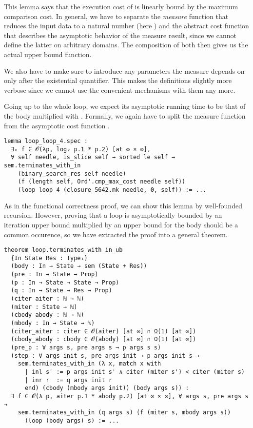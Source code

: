 This lemma says that the execution cost of  is linearly bound by
the maximum comparison cost. In general, we have to separate the \emph{measure}
function that reduces the input data to a natural number (here
) and the abstract cost function that describes
the asymptotic behavior of the measure result, since we cannot define the latter
on arbitrary domains. The composition of both then gives us the actual upper
bound function.

We also have to make sure to introduce any parameters the
measure depends on only after the existential quantifier. This makes the
definitions slightly more verbose since we cannot use the convenient
 mechanisms with them any more.

Going up to the whole loop, we expect its asymptotic running time to be that of the body
multiplied with . Formally, we again have to split the
measure function  from the asymptotic cost function .

\begin{verbatim}
lemma loop_loop_4.spec :
  ∃₀ f ∈ 𝓞(λp, log₂ p.1 * p.2) [at ∞ × ∞],
  ∀ self needle, is_slice self → sorted le self → sem.terminates_with_in
    (binary_search_res self needle)
    (f (length self, Ord'.cmp_max_cost needle self))
    (loop loop_4 (closure_5642.mk needle, 0, self)) := ...
\end{verbatim}

As in the functional correctness proof, we can show this lemma by well-founded
recursion. However, proving that a loop is asymptotically bounded by an
iteration upper bound multiplied by an upper bound for the body should be a
common occurence, so we have extracted the proof into a general theorem.

\begin{verbatim}
theorem loop.terminates_with_in_ub
  {In State Res : Type₁}
  (body : In → State → sem (State + Res))
  (pre : In → State → Prop)
  (p : In → State → State → Prop)
  (q : In → State → Res → Prop)
  (citer aiter : ℕ → ℕ)
  (miter : State → ℕ)
  (cbody abody : ℕ → ℕ)
  (mbody : In → State → ℕ)
  (citer_aiter : citer ∈ 𝓞(aiter) [at ∞] ∩ Ω(1) [at ∞])
  (cbody_abody : cbody ∈ 𝓞(abody) [at ∞] ∩ Ω(1) [at ∞])
  (pre_p : ∀ args s, pre args s → p args s s)
  (step : ∀ args init s, pre args init → p args init s →
    sem.terminates_with_in (λ x, match x with
      | inl s' := p args init s' ∧ citer (miter s') < citer (miter s)
      | inr r  := q args init r
      end) (cbody (mbody args init)) (body args s)) :
  ∃ f ∈ 𝓞(λ p, aiter p.1 * abody p.2) [at ∞ × ∞], ∀ args s, pre args s →
    sem.terminates_with_in (q args s) (f (miter s, mbody args s))
      (loop (body args) s) := ...
\end{verbatim}

